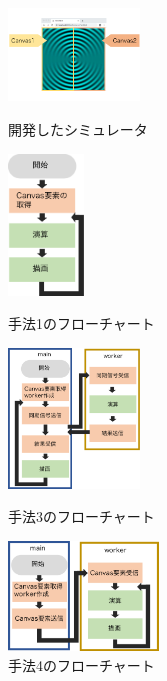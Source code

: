 \documentclass[twocolumn,10pt,a4j]{jsarticle}
\begin{document}
\setlength\textfloatsep{0pt}
\begin{figure}[htbp]
\begin{minipage}{0.49\hsize}
  \centering
   \includegraphics[width=35mm , angle=-90]{sim.pdf}
   \vspace{6pt}
  \caption{開発したシミュレータ}
  \label{fig:sim}
 \end{minipage}
 \begin{minipage}{0.49\hsize}
  \centering
   \includegraphics[width=20mm]{cpu_chart.pdf}
  \caption{手法1のフローチャート}
  \label{fig:cpu}
 \end{minipage}
 
 \begin{minipage}{0.5\hsize}
 \centering
  \vspace{5pt}	
  \includegraphics[width=35mm]{worker_chart.pdf}
     \belowcaptionskip=25pt
  \abovecaptionskip=5pt
  \caption{手法3のフローチャート}
  \label{fig:worker}
 \end{minipage}
 \begin{minipage}{0.5\hsize}
 \centering
 \vspace{-30pt}	
  \includegraphics[width=40mm  ]{offscreen_chart.pdf}
  \abovecaptionskip=30pt
  \belowcaptionskip=-10pt
  \caption{手法4のフローチャート}
  \label{fig:offsc}
 \end{minipage}
\end{figure}
\end{document}
